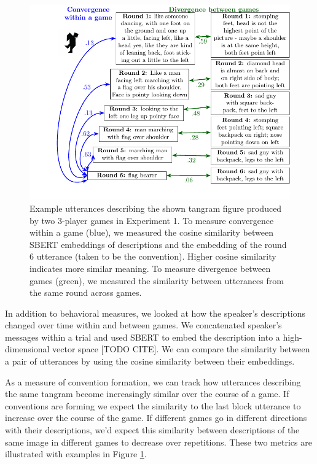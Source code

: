 \documentclass[
  english,
  a4paper,
]{article}
\begin{document}
\begin{figure}[t!]

{\centering \includegraphics[width=1\linewidth]{sbert} 

}

\caption{Example utterances describing the shown tangram figure produced by two 3-player games in Experiment 1. To measure convergence within a game (blue), we measured the cosine similarity between SBERT embeddings of descriptions and the embedding of the round 6 utterance (taken to be the convention). Higher cosine similarity indicates more similar meaning. To measure divergence between games (green), we measured the similarity between utterances from the same round across games.}\label{fig:sbert-diagram}
\end{figure}

In addition to behavioral measures, we looked at how the speaker's descriptions changed over time within and between games. We concatenated speaker's messages within a trial and used SBERT to embed the description into a high-dimensional vector space {[}TODO CITE{]}. We can compare the similarity between a pair of utterances by using the cosine similarity between their embeddings.

As a measure of convention formation, we can track how utterances describing the same tangram become increasingly similar over the course of a game. If conventions are forming we expect the similarity to the last block utterance to increase over the course of the game. If different games go in different directions with their descriptions, we'd expect this similarity between descriptions of the same image in different games to decrease over repetitions. These two metrics are illustrated with examples in Figure \ref{fig:sbert-diagram}.
\end{document}

